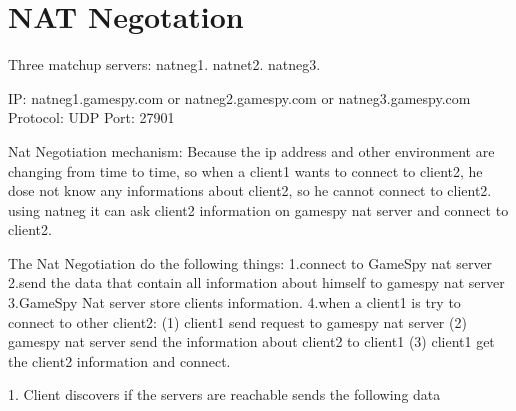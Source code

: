 \documentclass[oneside,titlepage,a4paper]{Definition/retrospy} %
\begin{document}
\chapter{NAT Negotation}
Three matchup servers: natneg1. natnet2. natneg3.

IP: natneg1.gamespy.com or natneg2.gamespy.com or natneg3.gamespy.com
Protocol: UDP
Port: 27901

Nat Negotiation mechanism:
Because the ip address and other environment are changing from time to time, so when a client1 wants to connect
to client2, he dose not know any informations about client2, so he cannot connect to client2. using natneg it can ask client2 information on gamespy nat server and connect to client2.

The Nat Negotiation do the following things:
1.connect to GameSpy nat server
2.send the data that contain all information about himself to gamespy nat server
3.GameSpy Nat server store clients information.
4.when a client1 is try to connect to other client2:
(1) client1 send request to gamespy nat server
(2) gamespy nat server send the information about client2 to client1
(3) client1 get the client2 information and connect.

1. Client discovers if the servers are reachable
sends the following data
\end{document}
